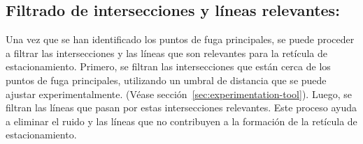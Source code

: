 \subsection{Filtrado de intersecciones y líneas relevantes:}

Una vez que se han identificado los puntos de fuga principales, se puede proceder a filtrar las intersecciones y las líneas que son
relevantes para la retícula de estacionamiento.
Primero, se filtran las intersecciones que están cerca de los puntos de fuga principales, utilizando un umbral de distancia que se puede ajustar experimentalmente. (Véase sección~\ref{sec:experimentation-tool}).
Luego, se filtran las líneas que pasan por estas intersecciones relevantes.
Este proceso ayuda a eliminar el ruido y las líneas que no contribuyen a la formación de la retícula de estacionamiento.
